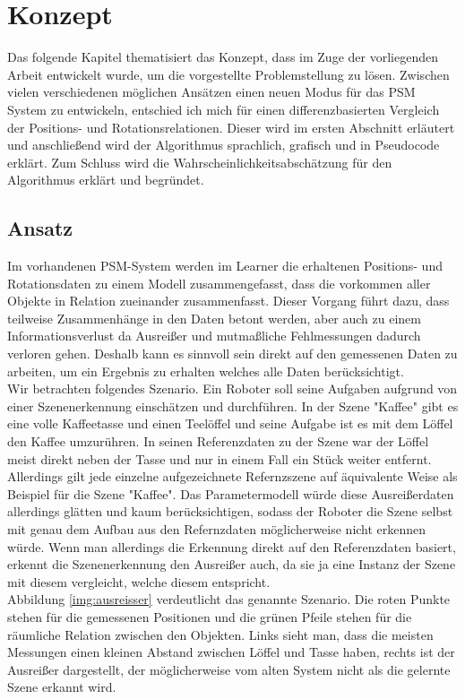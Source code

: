 \chapter{Konzept}\label{ch:konzept}
Das folgende Kapitel thematisiert das Konzept, dass im Zuge der vorliegenden Arbeit entwickelt wurde, um die vorgestellte Problemstellung zu lösen. Zwischen vielen verschiedenen möglichen Ansätzen einen neuen Modus für das PSM System zu entwickeln, entschied ich mich für einen differenzbasierten Vergleich der Positions- und Rotationsrelationen. Dieser wird im ersten Abschnitt erläutert und anschließend wird der Algorithmus sprachlich, grafisch und in Pseudocode erklärt. Zum Schluss wird die Wahrscheinlichkeitsabschätzung für den Algorithmus erklärt und begründet.
\section{Ansatz}
Im vorhandenen PSM-System werden im Learner die erhaltenen Positions- und Rotationsdaten zu einem Modell zusammengefasst, dass die vorkommen aller Objekte in Relation zueinander zusammenfasst. Dieser Vorgang führt dazu, dass teilweise Zusammenhänge in den Daten betont werden, aber auch zu einem Informationsverlust da Ausreißer und mutmaßliche Fehlmessungen dadurch verloren gehen. Deshalb kann es sinnvoll sein direkt auf den gemessenen Daten zu arbeiten, um ein Ergebnis zu erhalten welches alle Daten berücksichtigt. \smallskip\\
Wir betrachten folgendes Szenario. Ein Roboter soll seine Aufgaben aufgrund von einer Szenenerkennung einschätzen und durchführen. In der Szene "Kaffee" gibt es eine volle Kaffeetasse und einen Teelöffel und seine Aufgabe ist es mit dem Löffel den Kaffee umzurühren. In seinen Referenzdaten zu der Szene war der Löffel meist direkt neben der Tasse und nur in einem Fall ein Stück weiter entfernt. Allerdings gilt jede einzelne aufgezeichnete Refernzszene auf äquivalente Weise als Beispiel für die Szene "Kaffee". Das Parametermodell würde diese Ausreißerdaten allerdings glätten und kaum berücksichtigen, sodass der Roboter die Szene selbst mit genau dem Aufbau aus den Refernzdaten möglicherweise nicht erkennen würde. Wenn man allerdings die Erkennung direkt auf den Referenzdaten basiert, erkennt die Szenenerkennung den Ausreißer auch, da sie ja eine Instanz der Szene mit diesem vergleicht, welche diesem entspricht.\smallskip\\
Abbildung \ref{img:ausreisser} verdeutlicht das genannte Szenario. Die roten Punkte stehen für die gemessenen Positionen und die grünen Pfeile stehen für die räumliche Relation zwischen den Objekten. Links sieht man, dass die meisten Messungen einen kleinen Abstand zwischen Löffel und Tasse haben, rechts ist der Ausreißer dargestellt, der möglicherweise vom alten System nicht als die gelernte Szene erkannt wird.\smallskip\\
